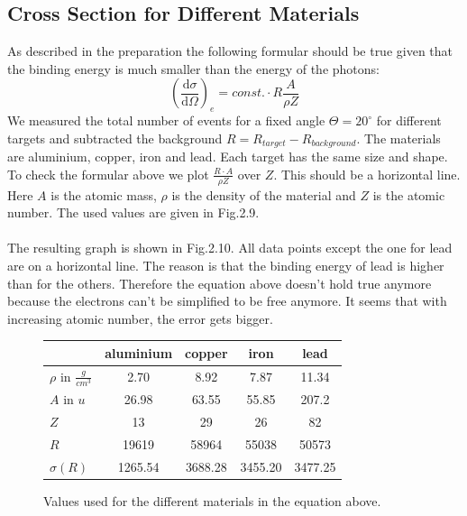 \subsection{Cross Section for Different Materials}

As described in the preparation the following formular should be true given that the binding energy is much smaller than the energy of the photons:
$$(\frac{\mathrm{d}\sigma}{\mathrm{d}\Omega})_e = const. \cdot R \frac{A}{\rho Z} $$
We measured the total number of events for a fixed angle $\Theta = 20 ^{\circ}$ for different targets and subtracted the background $R = R_{target} - R_{background}$. The materials are aluminium, copper, iron and lead. Each target has the same size and shape. \\
To check the formular above we plot $\frac{R \cdot A}{\rho Z}$ over $Z$. This should be a horizontal line. Here $A$ is the atomic mass, $\rho$ is the density of the material and $Z$ is the atomic number. The used values are given in Fig.2.9.\\
\\
The resulting graph is shown in Fig.2.10. All data points except the one for lead are on a horizontal line. The reason is that the binding energy of lead is higher than for the others. Therefore the equation above doesn't hold true anymore because the electrons can't be simplified to be free anymore. It seems that with increasing atomic number, the error gets bigger. 

\newpage

\begin{figure}[h]
\centering
\caption{Values used for the different materials in the equation above.}
\vspace{0.2cm}
\begin{tabular}{lcccc}
 & aluminium  & copper & iron & lead  \\
\hline
\hline
$\rho$ in $\frac{g}{cm^{3}}$ & 2.70 & 8.92 & 7.87 & 11.34 \\
$A$ in $u$ & 26.98 & 63.55 & 55.85 & 207.2 \\
$Z$ & 13 & 29 & 26 & 82 \\
$R$ & 19619 & 58964 & 55038 & 50573 \\
$\sigma (R)$ & 1265.54 & 3688.28 & 3455.20 & 3477.25 \\
\end{tabular}
\end{figure}


